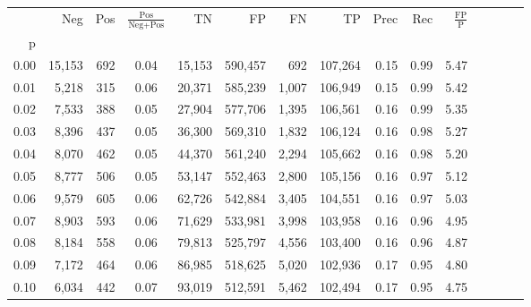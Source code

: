 \begin{tabular}{rrrcrrrrrrrrrrr}
\toprule
{} &     Neg &    Pos & $\frac{\text{Pos}}{\text{Neg}+\text{Pos}}$ &       TN &       FP &       FN &       TP &  Prec &   Rec & $\frac{\text{FP}}{\text{P}}$ \\
p    &         &        &                                            &          &          &          &          &       &       &                              \\
\midrule
0.00 &  15,153 &    692 &                                       0.04 &   15,153 &  590,457 &      692 &  107,264 &  0.15 &  0.99 &                         5.47 \\
0.01 &   5,218 &    315 &                                       0.06 &   20,371 &  585,239 &    1,007 &  106,949 &  0.15 &  0.99 &                         5.42 \\
0.02 &   7,533 &    388 &                                       0.05 &   27,904 &  577,706 &    1,395 &  106,561 &  0.16 &  0.99 &                         5.35 \\
0.03 &   8,396 &    437 &                                       0.05 &   36,300 &  569,310 &    1,832 &  106,124 &  0.16 &  0.98 &                         5.27 \\
0.04 &   8,070 &    462 &                                       0.05 &   44,370 &  561,240 &    2,294 &  105,662 &  0.16 &  0.98 &                         5.20 \\
0.05 &   8,777 &    506 &                                       0.05 &   53,147 &  552,463 &    2,800 &  105,156 &  0.16 &  0.97 &                         5.12 \\
0.06 &   9,579 &    605 &                                       0.06 &   62,726 &  542,884 &    3,405 &  104,551 &  0.16 &  0.97 &                         5.03 \\
0.07 &   8,903 &    593 &                                       0.06 &   71,629 &  533,981 &    3,998 &  103,958 &  0.16 &  0.96 &                         4.95 \\
0.08 &   8,184 &    558 &                                       0.06 &   79,813 &  525,797 &    4,556 &  103,400 &  0.16 &  0.96 &                         4.87 \\
0.09 &   7,172 &    464 &                                       0.06 &   86,985 &  518,625 &    5,020 &  102,936 &  0.17 &  0.95 &                         4.80 \\
0.10 &   6,034 &    442 &                                       0.07 &   93,019 &  512,591 &    5,462 &  102,494 &  0.17 &  0.95 &                         4.75 \\

\end{tabular}
